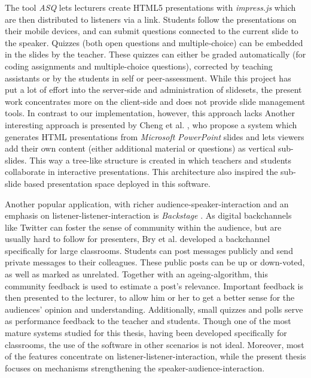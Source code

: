 The tool \emph{ASQ} \cite{Triglianos:InteractiveWebPresentationsImpress} lets lecturers create HTML5 presentations with \emph{impress.js} \cite{impressjs} which are then distributed to listeners via a link. Students follow the presentations on their mobile devices, and can submit questions connected to the current slide to the speaker. Quizzes (both open questions and multiple-choice) can be embedded in the slides by the teacher. These quizzes can either be graded automatically (for coding assignments and multiple-choice questions), corrected by teaching assistants or by the students in self or peer-assessment. While this project has put a lot of effort into the server-side and administration of slidesets, the present work concentrates more on the client-side and does not provide slide management tools. In contrast to our implementation, however, this approach lacks
Another interesting approach is presented by Cheng et al. \cite{Cheng:TreebasedOnlinePresentations}, who propose a system which generates HTML presentations from \emph{Microsoft PowerPoint} slides and lets viewers add their own content (either additional material or questions) as vertical sub-slides. This way a tree-like structure is created in which teachers and students collaborate in interactive presentations. This architecture also inspired the sub-slide based presentation space deployed in this software.

Another popular application, with richer audience-spea\-ker-in\-ter\-ac\-tion and an emphasis on listener-listener-interaction is \emph{Backstage} \cite{backstage}. As digital backchannels like Twitter can foster the sense of community within the audience, but are usually hard to follow for presenters, Bry et al. \cite{Bry:Backstage} developed a backchannel specifically for large classrooms. Students can post messages publicly and send private messages to their colleagues. These public posts can be up or down-voted, as well as marked as unrelated. Together with an ageing-algorithm, this community feedback is used to estimate a post's relevance. Important feedback is then presented to the lecturer, to allow him or her to get a better sense for the audiences' opinion and understanding. Additionally, small quizzes and polls serve as performance feedback to the teacher and students. Though one of the most mature systems studied for this thesis, having been developed specifically for classrooms, the use of the software in other scenarios is not ideal. Moreover, most of the features concentrate on listener-listener-interaction, while the present thesis focuses on mechanisms strengthening the speaker-audience-interaction.

